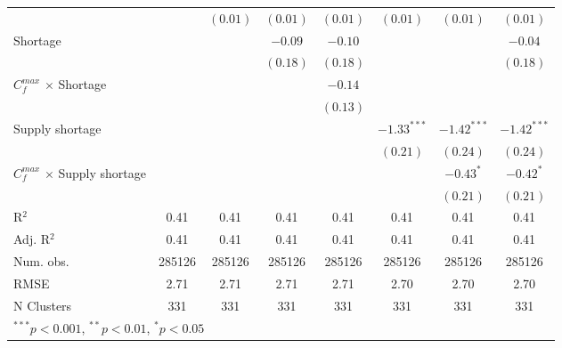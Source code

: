 \begin{tabular}{l c c c c c c c }
                                       &               & $(0.01)$      & $(0.01)$      & $(0.01)$      & $(0.01)$      & $(0.01)$      & $(0.01)$      \\
Shortage                               &               &               & $-0.09$       & $-0.10$       &               &               & $-0.04$       \\
                                       &               &               & $(0.18)$      & $(0.18)$      &               &               & $(0.18)$      \\
$C^{max}_{f}$ $\times$ Shortage        &               &               &               & $-0.14$       &               &               &               \\
                                       &               &               &               & $(0.13)$      &               &               &               \\
Supply shortage                        &               &               &               &               & $-1.33^{***}$ & $-1.42^{***}$ & $-1.42^{***}$ \\
                                       &               &               &               &               & $(0.21)$      & $(0.24)$      & $(0.24)$      \\
$C^{max}_{f}$ $\times$ Supply shortage &               &               &               &               &               & $-0.43^{*}$   & $-0.42^{*}$   \\
                                       &               &               &               &               &               & $(0.21)$      & $(0.21)$      \\
\midrule
R$^2$                                  & 0.41          & 0.41          & 0.41          & 0.41          & 0.41          & 0.41          & 0.41          \\
Adj. R$^2$                             & 0.41          & 0.41          & 0.41          & 0.41          & 0.41          & 0.41          & 0.41          \\
Num. obs.                              & 285126        & 285126        & 285126        & 285126        & 285126        & 285126        & 285126        \\
RMSE                                   & 2.71          & 2.71          & 2.71          & 2.71          & 2.70          & 2.70          & 2.70          \\
N Clusters                             & 331           & 331           & 331           & 331           & 331           & 331           & 331           \\
\bottomrule
\multicolumn{8}{l}{\tiny{$^{***}p<0.001$, $^{**}p<0.01$, $^*p<0.05$}}
\end{tabular}
